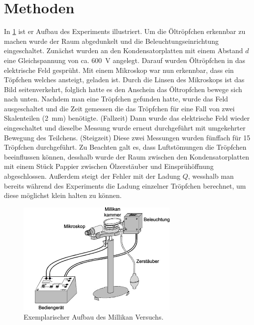 \documentclass[
	a4paper,
	12pt,
	pagesize,
	ngerman
]{scrartcl}
\begin{document}
	\section{Methoden}
	In \cref{Millikan} ist er Aufbau des Experiments illustriert.
	Um die Öltröpfchen erkennbar zu machen wurde der Raum abgedunkelt und die Beleuchtungseinrichtung eingeschaltet.
	Zunächst wurden an den Kondensatorplatten mit einem Abstand $d$ eine Gleichspannung von ca. \SI{600}{V} angelegt. 
	Darauf wurden Öltröpfchen in das elektrische Feld gesprüht.
	Mit einem Mikroskop war nun erkennbar, dass ein Töpfchen welches ansteigt, geladen ist. 
	Durch die Linsen des Mikroskops ist das Bild seitenverkehrt, folglich hatte es den Anschein das Öltropfchen bewege sich nach unten. 
	Nachdem man eine Tröpfchen gefunden hatte, wurde das Feld ausgeschaltet und die Zeit gemessen die das Tröpfchen für eine Fall von zwei Skalenteilen (\SI{2}{mm}) benötigte. (Fallzeit)
	Dann wurde das elektrische Feld wieder eingeschaltet und dieselbe Messung wurde erneut durchgeführt mit umgekehrter Bewegung des Teilchens. (Steigzeit)
	Diese zwei Messungen wurden fünffach für 15 Tröpfchen durchgeführt. 
	Zu Beachten galt es, dass Luftstömungen die Tröpfchen beeinflussen können, desshalb wurde der Raum zwischen den Kondensatorplatten mit einem Stück Pappier zwischen Ölzerstäuber und Einsprühöffnung abgeschlossen.
	Außerdem steigt der Fehler mit der Ladung $Q$, wesshalb man bereits während des Experiments die Ladung einzelner Tröpfchen berechnet, um diese möglichst klein halten zu können.


	\begin{figure}[H]
		\includegraphics[width=0.7\textwidth]{Millikan}
		\centering
		\caption{Exemplarischer Aufbau des Millikan Versuchs.\cite{TUM} }
		\label{Millikan}
		\centering
	\end{figure} 
\end{document}
